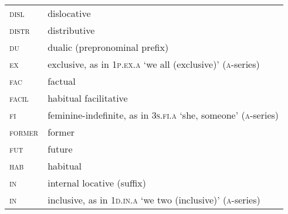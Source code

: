 \begin{tabularx}{\textwidth}{lQ}
\textsc{disl}            &      dislocative                           \\
\textsc{distr}           &      distributive                          \\
\textsc{du}            &      dualic (prepronominal prefix)         \\
\textsc{ex}	&	exclusive, as in \textsc{1p.ex.a} ‘we all (exclusive)’ (\textsc{a}-series) \\
\textsc{fac}             &      factual                               \\
\textsc{facil}           &      habitual facilitative                 \\
\textsc{fi}	&	feminine-indefinite, as in \textsc{3s.fi.a} ‘she, someone’ (\textsc{a}-series) \\
\textsc{former}             &      former                                \\
\textsc{fut}             &      future                                \\
\textsc{hab}             &      habitual                              \\
\textsc{in}        &       internal locative (suffix)                \\
\textsc{in}	&	inclusive, as in \textsc{1d.in.a} ‘we two (inclusive)’ (\textsc{a}-series)  \\
\end{tabularx}

